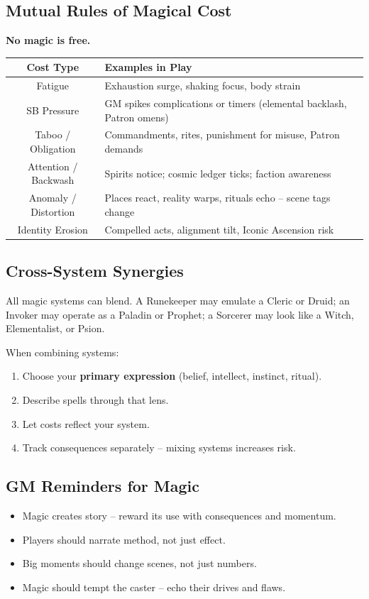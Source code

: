 \subsection{Mutual Rules of Magical Cost}
\begin{center}
\textbf{No magic is free.}
\end{center}

\centering
\small
\begin{tabular}{|c|p{9cm}|}
\hline
\textbf{Cost Type} & \textbf{Examples in Play} \\
\hline
Fatigue & Exhaustion surge, shaking focus, body strain \\
SB Pressure & GM spikes complications or timers (elemental backlash, Patron omens) \\
Taboo / Obligation & Commandments, rites, punishment for misuse, Patron demands \\
Attention / Backwash & Spirits notice; cosmic ledger ticks; faction awareness \\
Anomaly / Distortion & Places react, reality warps, rituals echo -- scene tags change \\
Identity Erosion & Compelled acts, alignment tilt, Iconic Ascension risk \\
\hline
\end{tabular}
\par

\subsection{Cross-System Synergies}
All magic systems can blend. A Runekeeper may emulate a Cleric or Druid; an Invoker may operate as a Paladin or Prophet; a Sorcerer may look like a Witch, Elementalist, or Psion.

When combining systems:
\begin{enumerate}
    \item Choose your \textbf{primary expression} (belief, intellect, instinct, ritual).
    \item Describe spells through that lens.
    \item Let costs reflect your system.
    \item Track consequences separately -- mixing systems increases risk.
\end{enumerate}

\subsection{GM Reminders for Magic}
\begin{itemize}
    \item Magic creates story -- reward its use with consequences and momentum.
    \item Players should narrate method, not just effect.
    \item Big moments should change scenes, not just numbers.
    \item Magic should tempt the caster -- echo their drives and flaws.
\end{itemize}

